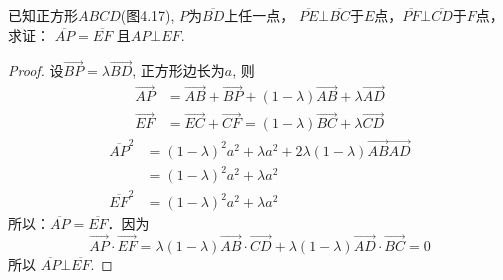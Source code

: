 \begin{example}
    已知正方形$ABCD$(图4.17), $P$为$\overline{BD}$上任一点，
$\overline{PE}\bot \overline{BC}$于$E$点，$\overline{PF}\bot \overline{CD}$于$F$点，求证：
$\overline{AP}=\overline{EF}$
且$AP\bot EF$.
\end{example}

\begin{proof}
设$\Vec{BP}=\lambda \Vec{BD}$, 正方形边长为$a$, 则
\[\begin{split}
    \Vec{AP}&=\Vec{AB}+\Vec{BP}+(1-\lambda)\Vec{AB}+\lambda\Vec{AD}\\
    \Vec{EF}&=\Vec{EC}+\Vec{CF}=(1-\lambda)\Vec{BC}+\lambda\Vec{CD}
\end{split}\]
\[\begin{split}
    \overline{AP}^2&=(1-\lambda )^2 a^2+\lambda a^2+2\lambda(1-\lambda)\Vec{AB}\Vec{AD}\\
&=(1-\lambda )^2 a^2+\lambda a^2\\
\overline{EF}^2&=(1-\lambda )^2 a^2+\lambda a^2
\end{split}\]
所以：$\overline{AP}=\overline{EF}$．因为
\[\Vec{AP}\cdot \Vec{EF}=\lambda (1-\lambda)\Vec{AB}\cdot \Vec{CD}+\lambda(1-\lambda)\Vec{AD}\cdot \Vec{BC}=0\]
所以
$\overline{AP} \bot \overline{EF}$.
\end{proof}

\begin{figure}[htp]\centering
    \begin{minipage}[t]{0.48\textwidth}
    \centering
{}
    \caption{}
    \end{minipage}
    \begin{minipage}[t]{0.48\textwidth}
    \centering
    \caption{}
    \end{minipage}
    \end{figure}

